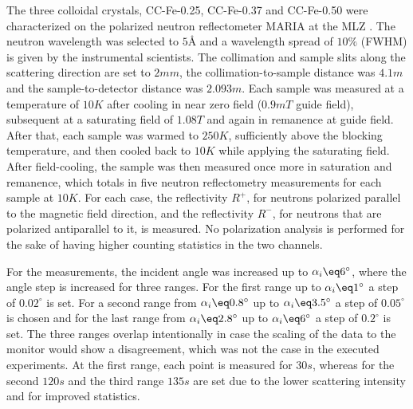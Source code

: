 \documentclass[\main/dresen_thesis.tex]{subfiles}
\begin{document}
    The three colloidal crystals, CC-Fe-0.25, CC-Fe-0.37 and CC-Fe-0.50 were characterized on the polarized neutron reflectometer MARIA at the MLZ .
    The neutron wavelength was selected to $5 \unit{\angstrom}$ and a wavelength spread of $10 \unit{\%}$ (FWHM) is given by the instrumental scientists.
    The collimation and sample slits along the scattering direction are set to $2 \unit{mm}$, the collimation-to-sample distance was $4.1 \unit{m}$ and the sample-to-detector distance was $2.093 \unit{m}$.
    Each sample was measured at a temperature of $10 \unit{K}$ after cooling in near zero field ($0.9 \unit{mT}$ guide field), subsequent at a saturating field of $1.08 \unit{T}$ and again in remanence at guide field.
    After that, each sample was warmed to $250 \unit{K}$, sufficiently above the blocking temperature, and then cooled back to $10 \unit{K}$ while applying the saturating field.
    After field-cooling, the sample was then measured once more in saturation and remanence, which totals in five neutron reflectometry measurements for each sample at $10 \unit{K}$.
    For each case, the reflectivity $R^{+}$, for neutrons polarized parallel to the magnetic field direction, and the reflectivity $R^{-}$, for neutrons that are polarized antiparallel to it, is measured.
    No polarization analysis is performed for the sake of having higher counting statistics in the two channels.

    For the measurements, the incident angle was increased up to $\alpha_i \eq 6 ^\circ$, where the angle step is increased for three ranges.
    For the first range up to $\alpha_i \eq 1 ^\circ$ a step of $0.02 ^\circ$ is set.
    For a second range from $\alpha_i \eq 0.8 ^\circ$ up to $\alpha_i \eq 3.5 ^\circ$ a step of $0.05 ^\circ$ is chosen and for the last range from $\alpha_i \eq 2.8 ^\circ$ up to $\alpha_i \eq 6 ^\circ$ a step of $0.2 ^\circ$ is set.
    The three ranges overlap intentionally in case the scaling of the data to the monitor would show a disagreement, which was not the case in the executed experiments.
    At the first range, each point is measured for $30 \unit{s}$, whereas for the second $120 \unit{s}$ and the third range $135 \unit{s}$ are set due to the lower scattering intensity and for improved statistics.
\end{document}
